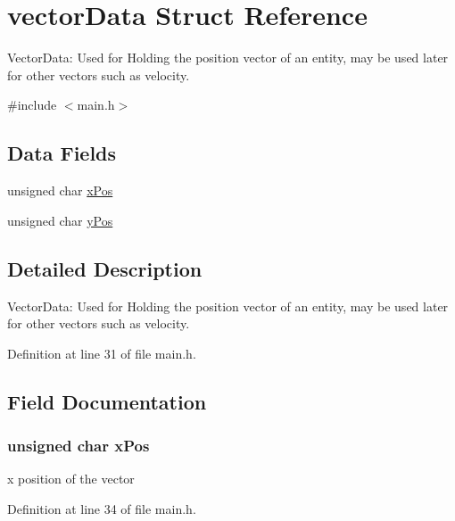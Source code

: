 \hypertarget{structvector_data}{}\section{vector\+Data Struct Reference}
\label{structvector_data}


Vector\+Data\+: Used for Holding the position vector of an entity, may be used later for other vectors such as velocity.  




{\ttfamily \#include $<$main.\+h$>$}

\subsection*{Data Fields}
\begin{DoxyCompactItemize}
\item 
unsigned char \hyperlink{structvector_data_af255d98242065aa6e2aa700ab7faf162}{x\+Pos}
\item 
unsigned char \hyperlink{structvector_data_a32a1f52aacf96b5af1f9b505ff1242cd}{y\+Pos}
\end{DoxyCompactItemize}


\subsection{Detailed Description}
Vector\+Data\+: Used for Holding the position vector of an entity, may be used later for other vectors such as velocity. 



Definition at line 31 of file main.\+h.



\subsection{Field Documentation}
\hypertarget{structvector_data_af255d98242065aa6e2aa700ab7faf162}{}
\subsubsection[{x\+Pos}]{\setlength{\rightskip}{0pt plus 5cm}unsigned char x\+Pos}\label{structvector_data_af255d98242065aa6e2aa700ab7faf162}
x position of the vector 

Definition at line 34 of file main.\+h.

\hypertarget{structvector_data_a32a1f52aacf96b5af1f9b505ff1242cd}{}
